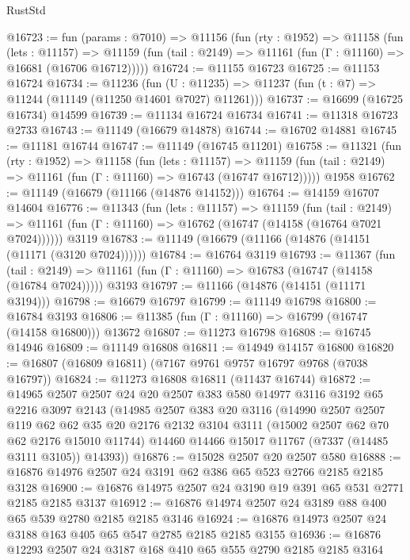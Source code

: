 \begin{lexlean}{RustStd}
\begin{coremodule}
@16723 := fun (params : @7010) =>
  @11156
    (fun (rty : @1952) =>
    @11158
      (fun (lets : @11157) =>
      @11159 (fun (tail : @2149) => @11161 (fun (Γ : @11160) => @16681 (@16706 @16712)))))
@16724 := @11155 @16723
@16725 := @11153 @16724
@16734 := @11236
    (fun (U : @11235) => @11237 (fun (t : @7) => @11244 (@11149 (@11250 @14601 @7027) @11261)))
@16737 := @16699 (@16725 @16734) @14599
@16739 := @11134 @16724 @16734
@16741 := @11318 @16723 @2733
@16743 := @11149 (@16679 @14878)
@16744 := @16702 @14881
@16745 := @11181 @16744
@16747 := @11149 (@16745 @11201)
@16758 := @11321
    (fun (rty : @1952) =>
    @11158
      (fun (lets : @11157) =>
      @11159 (fun (tail : @2149) => @11161 (fun (Γ : @11160) => @16743 (@16747 @16712)))))
    @1958
@16762 := @11149 (@16679 (@11166 (@14876 @14152)))
@16764 := @14159 @16707 @14604
@16776 := @11343
    (fun (lets : @11157) =>
    @11159
      (fun (tail : @2149) =>
      @11161 (fun (Γ : @11160) => @16762 (@16747 (@14158 (@16764 @7021 @7024))))))
    @3119
@16783 := @11149 (@16679 (@11166 (@14876 (@14151 (@11171 (@3120 @7024))))))
@16784 := @16764 @3119
@16793 := @11367
    (fun (tail : @2149) => @11161 (fun (Γ : @11160) => @16783 (@16747 (@14158 (@16784 @7024)))))
    @3193
@16797 := @11166 (@14876 (@14151 (@11171 @3194)))
@16798 := @16679 @16797
@16799 := @11149 @16798
@16800 := @16784 @3193
@16806 := @11385 (fun (Γ : @11160) => @16799 (@16747 (@14158 @16800))) @13672
@16807 := @11273 @16798
@16808 := @16745 @14946
@16809 := @11149 @16808
@16811 := @14949 @14157 @16800
@16820 := @16807 (@16809 @16811) (@7167 @9761 @9757 @16797 @9768 (@7038 @16797))
@16824 := @11273 @16808 @16811 (@11437 @16744)
@16872 := @14965
    @2507
    @2507
    @24
    @20
    @2507
    @383
    @580
    @14977
    @3116
    @3192
    @65
    @2216
    @3097
    @2143
    (@14985
      @2507
      @383
      @20
      @3116
      (@14990
        @2507
        @2507
        @119
        @62
        @62
        @35
        @20
        @2176
        @2132
        @3104
        @3111
        (@15002 @2507 @62 @70 @62 @2176 @15010 @11744)
        @14460
        @14466
        @15017
        @11767
        (@7337 (@14485 @3111 @3105))
        @14393))
@16876 := @15028 @2507 @20 @2507 @580
@16888 := @16876 @14976 @2507 @24 @3191 @62 @386 @65 @523 @2766 @2185 @2185 @3128
@16900 := @16876 @14975 @2507 @24 @3190 @19 @391 @65 @531 @2771 @2185 @2185 @3137
@16912 := @16876 @14974 @2507 @24 @3189 @88 @400 @65 @539 @2780 @2185 @2185 @3146
@16924 := @16876 @14973 @2507 @24 @3188 @163 @405 @65 @547 @2785 @2185 @2185 @3155
@16936 := @16876 @12293 @2507 @24 @3187 @168 @410 @65 @555 @2790 @2185 @2185 @3164

\end{coremodule}
\end{lexlean}
